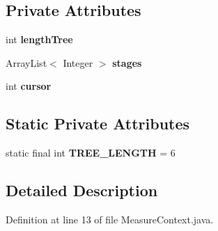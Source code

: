 \subsection*{Private Attributes}
\begin{DoxyCompactItemize}
\item 
\hypertarget{classcom_1_1qualoutdoor_1_1recorder_1_1persistent_1_1MeasureContext_a6aad1973ffdd0a971e585bd2ffdf7749}{int {\bfseries length\-Tree}}\label{classcom_1_1qualoutdoor_1_1recorder_1_1persistent_1_1MeasureContext_a6aad1973ffdd0a971e585bd2ffdf7749}

\item 
\hypertarget{classcom_1_1qualoutdoor_1_1recorder_1_1persistent_1_1MeasureContext_acb05ac566e761fbdcf5f3fd1e8912543}{Array\-List$<$ Integer $>$ {\bfseries stages}}\label{classcom_1_1qualoutdoor_1_1recorder_1_1persistent_1_1MeasureContext_acb05ac566e761fbdcf5f3fd1e8912543}

\item 
\hypertarget{classcom_1_1qualoutdoor_1_1recorder_1_1persistent_1_1MeasureContext_a2f2d5c3742f51491bf82b1bc068fffac}{int {\bfseries cursor}}\label{classcom_1_1qualoutdoor_1_1recorder_1_1persistent_1_1MeasureContext_a2f2d5c3742f51491bf82b1bc068fffac}

\end{DoxyCompactItemize}
\subsection*{Static Private Attributes}
\begin{DoxyCompactItemize}
\item 
\hypertarget{classcom_1_1qualoutdoor_1_1recorder_1_1persistent_1_1MeasureContext_a90a42d87cdb2aeb2c6f1af038a9afdcf}{static final int {\bfseries T\-R\-E\-E\-\_\-\-L\-E\-N\-G\-T\-H} = 6}\label{classcom_1_1qualoutdoor_1_1recorder_1_1persistent_1_1MeasureContext_a90a42d87cdb2aeb2c6f1af038a9afdcf}

\end{DoxyCompactItemize}


\subsection{Detailed Description}


Definition at line 13 of file Measure\-Context.\-java.




